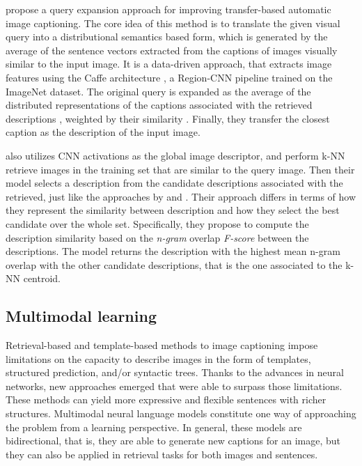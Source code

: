 \citet{Yagcioglu2015} propose a query expansion approach for improving transfer-based automatic image captioning. The core idea of this method is to translate the given visual query into a distributional semantics based form, which is generated by the average of the sentence vectors extracted from the captions of images visually similar to the input image. It is a data-driven approach, that extracts image features using the Caffe architecture \citep{Jia2014}, a Region-CNN pipeline trained on the ImageNet dataset. The original query is expanded as the average of the distributed representations of the captions associated with the retrieved descriptions \citep{Mikolov2013}, weighted by their similarity . Finally, they transfer the closest caption as the description of the input image.

\citet{Devlin2015} also utilizes CNN activations as the global image descriptor, and perform k-NN retrieve images in the training set that are similar to the query image. Then their model selects a description from the candidate descriptions associated with the retrieved, just like the approaches by \citet{Mason2015} and \citet{Yagcioglu2015}. Their approach differs in terms of how they represent the similarity between description and how they select the best candidate over the whole set. Specifically, they propose to compute the description similarity based on the \textit{n-gram} overlap \textit{F-score} between the descriptions. The model returns the description with the highest mean n-gram overlap with the other candidate descriptions, that is the one associated to the k-NN centroid.

\subsection{Multimodal learning}

Retrieval-based and template-based methods to image captioning impose limitations on the capacity to describe images in the form of templates, structured prediction, and/or syntactic trees. Thanks to the advances in neural networks, new approaches emerged that were able to surpass those limitations. These methods can yield more expressive and flexible sentences with richer structures.  Multimodal neural language models constitute one way of approaching the problem from a learning perspective. In general, these models are bidirectional, that is, they are able to generate new captions for an image, but they can also be applied in retrieval tasks for both images and sentences.

